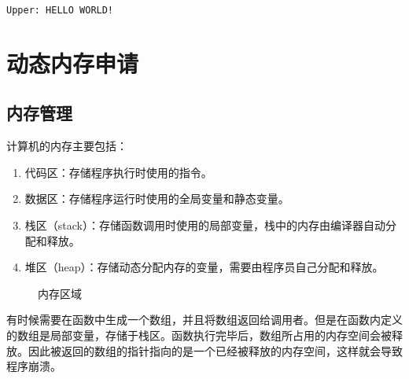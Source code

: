 \begin{tcolorbox}
    \begin{verbatim}
Upper: HELLO WORLD!
	\end{verbatim}
\end{tcolorbox}

\newpage

\section{动态内存申请}

\subsection{内存管理}

计算机的内存主要包括：

\begin{enumerate}
    \item 代码区：存储程序执行时使用的指令。
    \item 数据区：存储程序运行时使用的全局变量和静态变量。
    \item 栈区（stack）：存储函数调用时使用的局部变量，栈中的内存由编译器自动分配和释放。
    \item 堆区（heap）：存储动态分配内存的变量，需要由程序员自己分配和释放。
\end{enumerate}

\begin{figure}[H]
    \centering
    \caption{内存区域}
\end{figure}

有时候需要在函数中生成一个数组，并且将数组返回给调用者。但是在函数内定义的数组是局部变量，存储于栈区。函数执行完毕后，数组所占用的内存空间会被释放。因此被返回的数组的指针指向的是一个已经被释放的内存空间，这样就会导致程序崩溃。\\

